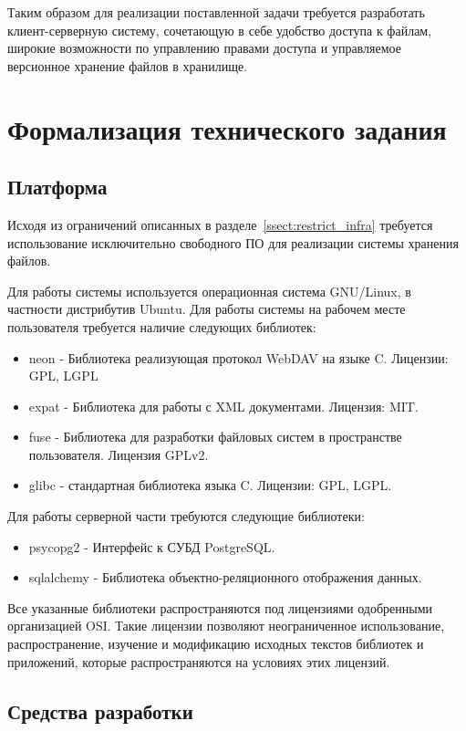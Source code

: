 \documentclass[utf8,usehyperref,12pt]{G7-32}
\begin{document}
Таким образом для реализации поставленной задачи требуется разработать клиент-серверную систему, сочетающую в себе удобство доступа к файлам, широкие возможности по управлению правами доступа и управляемое версионное хранение файлов в хранилище.

\section{Формализация технического задания}
\subsection{Платформа}\label{ssect:platform}
Исходя из ограничений описанных в разделе~\ref{ssect:restrict_infra} требуется использование исключительно свободного ПО для реализации системы хранения файлов. 

Для работы системы используется операционная система GNU/Linux, в частности дистрибутив Ubuntu. Для работы системы на рабочем месте пользователя требуется наличие следующих библиотек:

\begin{itemize}
 \item neon - Библиотека реализующая протокол WebDAV на языке C. Лицензии: GPL, LGPL
 \item expat - Библиотека для работы с XML документами. Лицензия: MIT.
 \item fuse - Библиотека для разработки файловых систем в пространстве пользователя. Лицензия GPLv2.
 \item glibc - стандартная библиотека языка C. Лицензии: GPL, LGPL.
\end{itemize}

Для работы серверной части требуются следующие библиотеки:
\begin{itemize}
 \item psycopg2 - Интерфейс к СУБД PostgreSQL.
 \item sqlalchemy - Библиотека объектно-реляционного отображения данных.
\end{itemize}
Все указанные библиотеки распространяются под лицензиями одобренными организацией OSI. Такие лицензии позволяют неограниченное использование, распространение, изучение и модификацию исходных текстов библиотек и приложений, которые распространяются на условиях этих лицензий.

\subsection{Средства разработки}
\end{document}
